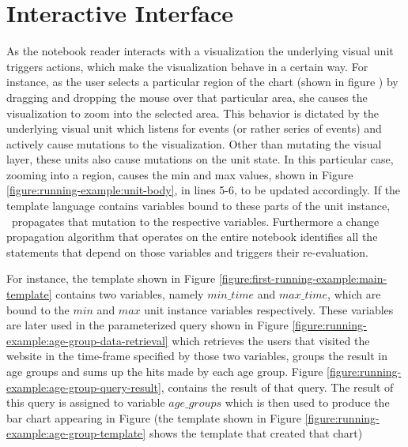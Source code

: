 \section{Interactive Interface}
\label{section:interactive-interface}



As the notebook reader interacts with a visualization the underlying visual unit triggers actions, which make the visualization behave in a certain way. For instance, as the user selects a particular region of the chart (shown in figure ) by dragging and dropping the mouse over that particular area, she causes the visualization to zoom into the selected area. This behavior is dictated by the underlying visual unit which listens for events (or rather series of events) and actively cause mutations to the visualization. Other than mutating the visual layer, these units also cause mutations on the unit state. In this particular case, zooming into a region, causes the min and max values, shown in Figure \ref{figure:running-example:unit-body}, in lines 5-6, to be updated accordingly. If the template language contains variables bound to these parts of the unit instance, \projname\ propagates that mutation to the respective variables. Furthermore a change propagation algorithm that operates on the entire notebook identifies all the statements that depend on those variables and triggers their re-evaluation.


For instance, the template shown in Figure \ref{figure:first-running-example:main-template} contains two variables, namely $min\_time$ and $max\_time$, which are bound to the $min$ and $max$ unit instance variables respectively. These variables are later used in the parameterized query shown in Figure \ref{figure:running-example:age-group-data-retrieval} which retrieves the users that visited the website in the time-frame specified by those two variables, groups the result in age groups and sums up the hits made by each age group. Figure \ref{figure:running-example:age-group-query-result}, contains the result of that query. The result of this query is assigned to variable $age\_groups$ which is then used to produce the bar chart appearing in Figure  (the template shown in Figure \ref{figure:running-example:age-group-template} shows the template that created that chart)


